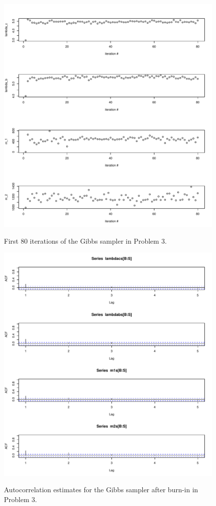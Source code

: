 \documentclass[12pt]{article}
\begin{document}
\begin{figure}[htp]
\centering
\includegraphics[width=6.5in]{burn}
\label{fig:burn}
\caption{First 80 iterations of the Gibbs sampler in Problem 3.}
\end{figure}

\begin{figure}[htp]
\centering
\includegraphics[width=6.5in]{acf}
\label{fig:acf}
\caption{Autocorrelation estimates for the Gibbs sampler after burn-in in Problem 3.}
\end{figure}
\end{document}
